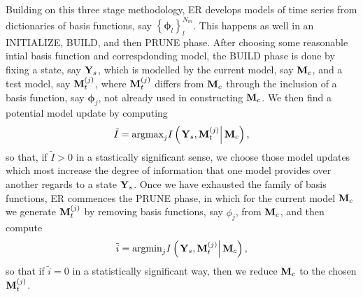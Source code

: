 \documentclass[a4paper,11pt]{article}
\begin{document}
Building on this three stage methodology, ER develops models of time series from dictionaries of basis functions, say $\left\{\mathbf{\phi}_{l}\right\}_{l}^{N_{m}}$.  This happens as well in an  INITIALIZE, BUILD, and then PRUNE phase.  After choosing some reasonable intial basis function and correspdonding model, the BUILD phase is done by fixing a state, say ${\bf Y}_{s}$, which is modelled by the current model, say ${\bf M}_{c}$, and a test model, say ${\bf M}^{(j)}_{t}$, where ${\bf M}^{(j)}_{t}$ differs from ${\bf M}_{c}$ through the inclusion of a basis function, say $\mathbf{\phi}_{j}$, not already used in constructing ${\bf M}_{c}$.  We then find a potential model update by computing
\[
\tilde{I} = \text{argmax}_{j}I\left(\left.{\bf Y}_{s}, {\bf M}_{t}^{(j)}\right| {\bf M}_{c}\right),
\]
so that, if $\tilde{I}>0$ in a stastically significant sense, we choose those model updates which most increase the degree of information that one model provides over another regards to a state ${\bf Y}_{s}$.  Once we have exhausted the family of basis functions, ER commences the PRUNE phase, in which for the current model ${\bf M}_{c}$ we generate ${\bf M}_{t}^{(j)}$ by removing basis functions, say $\phi_{j}$, from ${\bf M}_{c}$, and then compute 
\[
\tilde{i} = \text{argmin}_{j}I\left(\left.{\bf Y}_{s}, {\bf M}_{t}^{(j)}\right| {\bf M}_{c}\right),
\]
so that if $\tilde{i}=0$ in a statistically significant way, then we reduce ${\bf M}_{c}$ to the chosen ${\bf M}_{t}^{(j)}$.  
\end{document}
